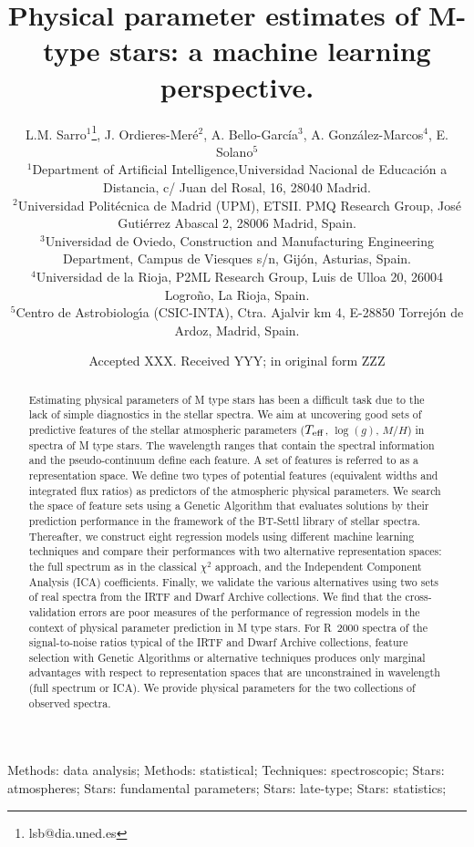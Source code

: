 \documentclass[a4paper,fleqn,usenatbib]{mnras}
\title{Physical parameter estimates of M-type stars: a machine learning perspective.}
\author[L. M. Sarro et al.]
          {
L.M. Sarro$^{1}$\thanks{lsb@dia.uned.es},
J. Ordieres-Mer\'e$^{2}$,       
A. Bello-Garc\'ia$^{3}$, 
A. Gonz\'alez-Marcos$^{4}$, 
E. Solano$^{5}$
\\
$^{1}$Department of Artificial Intelligence,Universidad Nacional de Educaci\'{o}n a Distancia, c/ Juan del Rosal, 16, 28040 Madrid.\\
$^{2}$Universidad Polit\'{e}cnica de Madrid (UPM), ETSII. PMQ Research Group, Jos\'{e} Guti\'{e}rrez Abascal 2, 28006 Madrid, Spain. \\
$^{3}$Universidad de Oviedo, Construction and Manufacturing Engineering Department, Campus de Viesques s/n, Gij\'{o}n, Asturias, Spain. \\
$^{4}$Universidad de la Rioja, P2ML Research Group, Luis de Ulloa 20, 26004 Logro\~{n}o, La Rioja, Spain. \\
$^{5}$Centro de Astrobiolog\'{\i}a (CSIC-INTA), Ctra. Ajalvir km 4, E-28850 Torrejón de Ardoz, Madrid, Spain.\\
}
\date{Accepted XXX. Received YYY; in original form ZZZ}
\begin{document}
 
\label{firstpage}
\pagerange{\pageref{firstpage}--\pageref{lastpage}}
\maketitle

\begin{abstract}
    Estimating physical parameters of M type stars has been a
    difficult task due to the lack of simple diagnostics in the
    stellar spectra.  We aim at uncovering good sets of predictive
    features of the stellar atmospheric parameters ($T_{\rm eff}$,
    $\log(g)$, $M/H$) in spectra of M type stars.  The wavelength
    ranges that contain the spectral information and the
    pseudo-continuum define each feature. A set of features is
    referred to as a representation space.  We define two types of
    potential features (equivalent widths and integrated flux ratios)
    as predictors of the atmospheric physical parameters. We search
    the space of feature sets using a Genetic Algorithm that evaluates
    solutions by their prediction performance in the framework of the
    BT-Settl library of stellar spectra. Thereafter, we construct
    eight regression models using different machine learning
    techniques and compare their performances with two alternative
    representation spaces: the full spectrum as in the classical
    $\chi^2$ approach, and the Independent Component Analysis (ICA)
    coefficients. Finally, we validate the various alternatives using
    two sets of real spectra from the IRTF and Dwarf Archive
    collections.  We find that the cross-validation errors are poor
    measures of the performance of regression models in the context of
    physical parameter prediction in M type stars. For R~2000 spectra
    of the signal-to-noise ratios typical of the IRTF and Dwarf
    Archive collections, feature selection with Genetic Algorithms or
    alternative techniques produces only marginal advantages with
    respect to representation spaces that are unconstrained in
    wavelength (full spectrum or ICA). We provide physical parameters
    for the two collections of observed spectra.
\end{abstract}

\begin{keywords}
Methods: data analysis; Methods: statistical;
     Techniques: spectroscopic; Stars: atmospheres; Stars: fundamental
     parameters; Stars: late-type; Stars: statistics;
\end{keywords}
\end{document}
